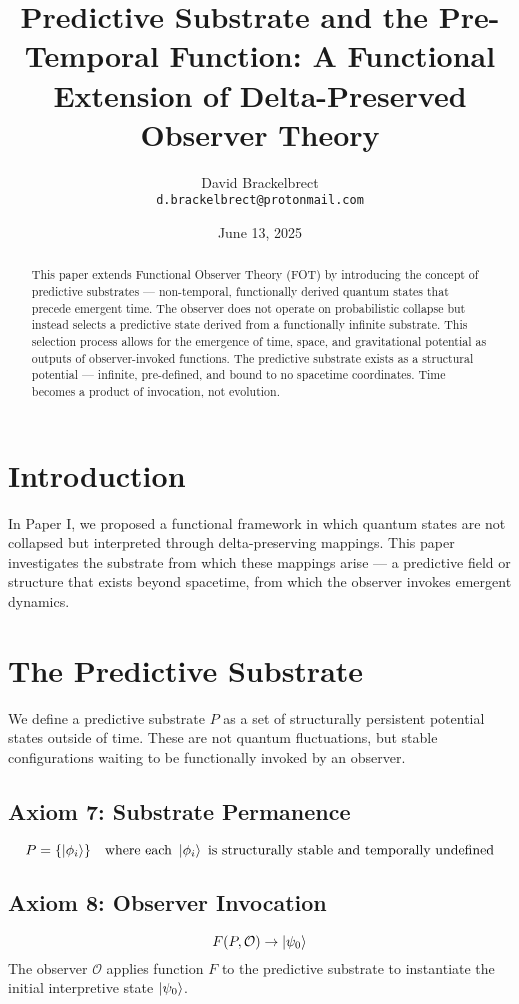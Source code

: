 \documentclass[12pt]{article}
\title{Predictive Substrate and the Pre-Temporal Function: A Functional Extension of Delta-Preserved Observer Theory}
\author{David Brackelbrect \\ \texttt{d.brackelbrect@protonmail.com}}
\date{June 13, 2025}
\begin{document}
\maketitle

\begin{abstract}
This paper extends Functional Observer Theory (FOT) by introducing the concept of predictive substrates — non-temporal, functionally derived quantum states that precede emergent time. The observer does not operate on probabilistic collapse but instead selects a predictive state derived from a functionally infinite substrate. This selection process allows for the emergence of time, space, and gravitational potential as outputs of observer-invoked functions. The predictive substrate exists as a structural potential — infinite, pre-defined, and bound to no spacetime coordinates. Time becomes a product of invocation, not evolution.
\end{abstract}

\section{Introduction}
In Paper I, we proposed a functional framework in which quantum states are not collapsed but interpreted through delta-preserving mappings. This paper investigates the substrate from which these mappings arise — a predictive field or structure that exists beyond spacetime, from which the observer invokes emergent dynamics.

\section{The Predictive Substrate}
We define a predictive substrate $P$ as a set of structurally persistent potential states outside of time. These are not quantum fluctuations, but stable configurations waiting to be functionally invoked by an observer.

\subsection*{Axiom 7: Substrate Permanence}
\[
P = \{ \ket{\phi_i} \} \quad \text{where each } \ket{\phi_i} \text{ is structurally stable and temporally undefined}
\]

\subsection*{Axiom 8: Observer Invocation}
\[
F(P, \mathcal{O}) \rightarrow \ket{\psi_0}
\]
The observer $\mathcal{O}$ applies function $F$ to the predictive substrate to instantiate the initial interpretive state $\ket{\psi_0}$.
\end{document}
